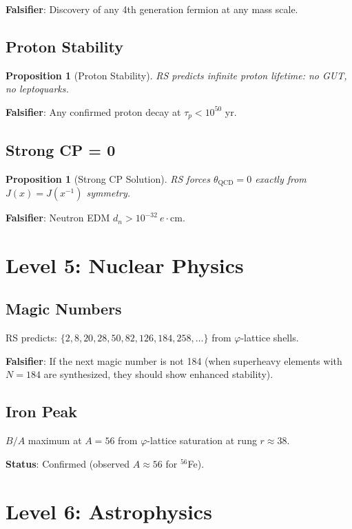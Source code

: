 \documentclass[12pt,a4paper]{article}
\newtheorem{proposition}[theorem]{Proposition}
\theoremstyle{definition}
\theoremstyle{remark}
\begin{document}
\textbf{Falsifier}: Discovery of any 4th generation fermion at any mass scale.

\subsection{Proton Stability}

\begin{proposition}[Proton Stability]
RS predicts infinite proton lifetime: no GUT, no leptoquarks.
\end{proposition}

\textbf{Falsifier}: Any confirmed proton decay at $\tau_p < 10^{50}$ yr.

\subsection{Strong CP = 0}

\begin{proposition}[Strong CP Solution]
RS forces $\theta_\mathrm{QCD} = 0$ exactly from $J(x) = J(x^{-1})$ symmetry.
\end{proposition}

\textbf{Falsifier}: Neutron EDM $d_n > 10^{-32}~e\cdot\mathrm{cm}$.

\section{Level 5: Nuclear Physics}

\subsection{Magic Numbers}

RS predicts: $\{2, 8, 20, 28, 50, 82, 126, 184, 258, \ldots\}$ from $\varphi$-lattice shells.

\textbf{Falsifier}: If the next magic number is not 184 (when superheavy elements with $N = 184$ 
are synthesized, they should show enhanced stability).

\subsection{Iron Peak}

$B/A$ maximum at $A = 56$ from $\varphi$-lattice saturation at rung $r \approx 38$.

\textbf{Status}: Confirmed (observed $A \approx 56$ for $^{56}$Fe).

\section{Level 6: Astrophysics}
\end{document}
